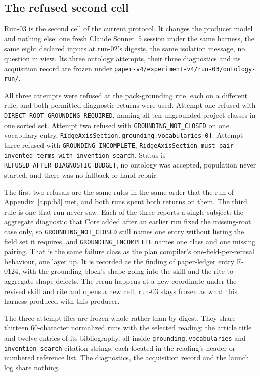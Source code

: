 \documentclass[10pt]{article}
\newcommand{\code}[1]{\texttt{#1}}
\begin{document}
\subsection{The refused second cell}
\label{app:b4}

Run-03 is the second cell of the current protocol. It changes the producer model and nothing else: one fresh Claude Sonnet~5 session under the same harness, the same eight declared inputs at run-02's digests, the same isolation message, no question in view. Its three ontology attempts, their three diagnostics and its acquisition record are frozen under \code{paper-v4/experiment-v4/run-03/ontology-run/}.

All three attempts were refused at the pack-grounding rite, each on a different rule, and both permitted diagnostic returns were used. Attempt one refused with \code{DIRECT\_ROOT\_GROUNDING\_REQUIRED}, naming all ten ungrounded project classes in one sorted set. Attempt two refused with \code{GROUNDING\_NOT\_CLOSED} on one vocabulary entry, \code{RidgeAxisSection.grounding.vocabularies[0]}. Attempt three refused with \code{GROUNDING\_INCOMPLETE}, \code{RidgeAxisSection must pair invented terms with invention\_search}. Status is \code{REFUSED\_AFTER\_DIAGNOSTIC\_BUDGET}, no ontology was accepted, population never started, and there was no fallback or hand repair.

The first two refusals are the same rules in the same order that the run of Appendix~\ref{app:b3} met, and both runs spent both returns on them. The third rule is one that run never saw. Each of the three reports a single subject: the aggregate diagnostic that Core added after an earlier run fixed the missing-root case only, so \code{GROUNDING\_NOT\_CLOSED} still names one entry without listing the field set it requires, and \code{GROUNDING\_INCOMPLETE} names one class and one missing pairing. That is the same failure class as the plan compiler's one-field-per-refusal behaviour, one layer up. It is recorded as the finding of paper-ledger entry E-0124, with the grounding block's shape going into the skill and the rite to aggregate shape defects. The rerun happens at a new coordinate under the revised skill and rite and opens a new cell; run-03 stays frozen as what this harness produced with this producer.

The three attempt files are frozen whole rather than by digest. They share thirteen 60-character normalized runs with the selected reading: the article title and twelve entries of its bibliography, all inside \code{grounding.vocabularies} and \code{invention\_search} citation strings, each located in the reading's header or numbered reference list. The diagnostics, the acquisition record and the launch log share nothing.
\end{document}
